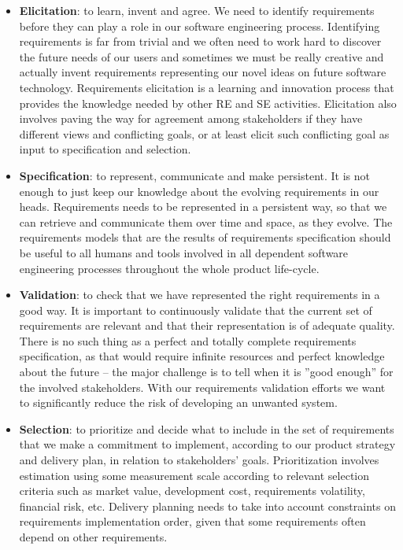 \begin{itemize}
  \item \textbf{Elicitation}: to learn, invent and agree. We need to identify requirements before they can play a role in our software engineering process. Identifying requirements is far from trivial and we often need to work hard to discover the future needs of our users and sometimes we must be really creative and actually invent requirements representing our novel ideas on future software technology. Requirements elicitation is a learning and innovation process that provides the knowledge needed by other RE and SE activities. Elicitation also involves paving the way for agreement among stakeholders  if they have different views and conflicting goals, or at least elicit such conflicting goal as input to specification and selection.

  \item \textbf{Specification}: to represent, communicate and make persistent. It is not enough to just keep our knowledge about the evolving requirements in our heads. Requirements needs to be represented in a persistent way, so that we can retrieve and communicate them over time and space, as they evolve. The requirements models that are the results of requirements specification should be useful to all humans and tools involved in all dependent software engineering processes throughout the whole product life-cycle.
  \item \textbf{Validation}: to check that we have represented the right requirements in a good way. It is important to continuously validate that the current set of requirements are relevant and that their representation is of adequate quality. There is no such thing as a perfect and totally complete requirements specification, as that would require infinite resources and perfect knowledge about the future -- the major challenge is to tell when it is ''good enough'' for the involved stakeholders. With our requirements validation efforts we want to significantly reduce the risk of developing an unwanted system.
  \item \textbf{Selection}: to prioritize and decide what to include in the set of requirements that we make a commitment to implement, according to our product strategy and delivery plan, in relation to stakeholders' goals. Prioritization involves estimation using some measurement scale according to relevant selection criteria such as market value, development cost, requirements volatility, financial risk, etc. Delivery planning needs to take into account constraints on requirements implementation order, given that some requirements often depend on other requirements. 
\end{itemize} 

